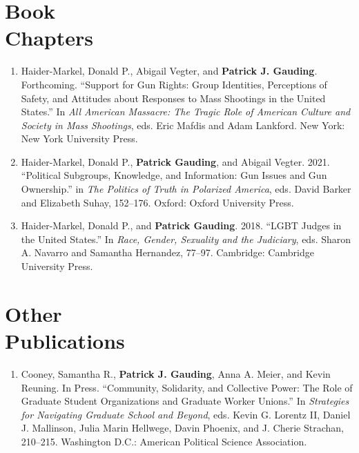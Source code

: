\documentclass[margin,line,pifont,palatino,courier]{res}
\begin{document}
\begin{resume}
\section{\sc Book \\Chapters}

\begin{enumerate}

\item Haider-Markel, Donald P., Abigail Vegter, and \textbf{Patrick
    J. Gauding}. Forthcoming. ``Support for Gun Rights: Group
  Identities, Perceptions of Safety, and Attitudes about Responses to
  Mass Shootings in the United States.'' In \textit{All American
    Massacre: The Tragic Role of American Culture and Society in Mass
    Shootings}, eds. Eric Mafdis and Adam Lankford. New York: New York
  University Press.

\item Haider-Markel, Donald P., \textbf{Patrick Gauding}, and Abigail
  Vegter. 2021. ``Political Subgroups, Knowledge, and Information: Gun
  Issues and Gun Ownership.'' in \textit{The Politics of Truth in
    Polarized America}, eds. David Barker and Elizabeth Suhay,
  152--176. Oxford: Oxford University Press.

\item Haider-Markel, Donald P., and \textbf{Patrick
    Gauding}. 2018. ``LGBT Judges in the United States.'' In
  \textit{Race, Gender, Sexuality and the Judiciary}, eds. Sharon
  A. Navarro and Samantha Hernandez, 77--97. Cambridge: Cambridge
  University Press.

\end{enumerate}

\section{\sc Other\\Publications}

\begin{enumerate}

\item Cooney, Samantha R., \textbf{Patrick J. Gauding}, Anna A. Meier,
  and Kevin Reuning. In Press. ``Community, Solidarity, and Collective
  Power: The Role of Graduate Student Organizations and Graduate
  Worker Unions.'' In \textit{Strategies for Navigating Graduate
    School and Beyond}, eds. Kevin G. Lorentz II, Daniel J. Mallinson,
  Julia Marin Hellwege, Davin Phoenix, and J. Cherie Strachan,
  210--215. Washington D.C.: American Political Science Association.


\end{enumerate}
\end{resume}
\end{document}
